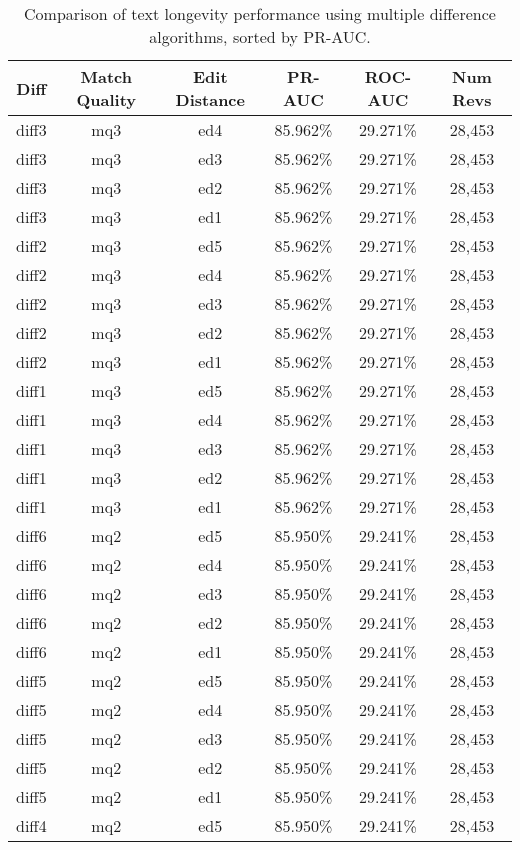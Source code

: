 \begin{table}[tbph]
\begin{center}
\begin{tabular}{|c|c|c||c|c|c|}
\hline
Diff & Match Quality & Edit Distance & PR-AUC & ROC-AUC & Num Revs \\
\hline
\hline
diff3 & mq3 & ed4 & 85.962\% & 29.271\% & 28,453 \\
diff3 & mq3 & ed3 & 85.962\% & 29.271\% & 28,453 \\
diff3 & mq3 & ed2 & 85.962\% & 29.271\% & 28,453 \\
diff3 & mq3 & ed1 & 85.962\% & 29.271\% & 28,453 \\
diff2 & mq3 & ed5 & 85.962\% & 29.271\% & 28,453 \\
diff2 & mq3 & ed4 & 85.962\% & 29.271\% & 28,453 \\
diff2 & mq3 & ed3 & 85.962\% & 29.271\% & 28,453 \\
diff2 & mq3 & ed2 & 85.962\% & 29.271\% & 28,453 \\
diff2 & mq3 & ed1 & 85.962\% & 29.271\% & 28,453 \\
diff1 & mq3 & ed5 & 85.962\% & 29.271\% & 28,453 \\
diff1 & mq3 & ed4 & 85.962\% & 29.271\% & 28,453 \\
diff1 & mq3 & ed3 & 85.962\% & 29.271\% & 28,453 \\
diff1 & mq3 & ed2 & 85.962\% & 29.271\% & 28,453 \\
diff1 & mq3 & ed1 & 85.962\% & 29.271\% & 28,453 \\
diff6 & mq2 & ed5 & 85.950\% & 29.241\% & 28,453 \\
diff6 & mq2 & ed4 & 85.950\% & 29.241\% & 28,453 \\
diff6 & mq2 & ed3 & 85.950\% & 29.241\% & 28,453 \\
diff6 & mq2 & ed2 & 85.950\% & 29.241\% & 28,453 \\
diff6 & mq2 & ed1 & 85.950\% & 29.241\% & 28,453 \\
diff5 & mq2 & ed5 & 85.950\% & 29.241\% & 28,453 \\
diff5 & mq2 & ed4 & 85.950\% & 29.241\% & 28,453 \\
diff5 & mq2 & ed3 & 85.950\% & 29.241\% & 28,453 \\
diff5 & mq2 & ed2 & 85.950\% & 29.241\% & 28,453 \\
diff5 & mq2 & ed1 & 85.950\% & 29.241\% & 28,453 \\
diff4 & mq2 & ed5 & 85.950\% & 29.241\% & 28,453 \\
\hline
\end{tabular}
\end{center}
\caption{Comparison of text longevity performance using
    multiple difference algorithms, sorted by PR-AUC.}
\label{tab:textshoutD}
\end{table}
